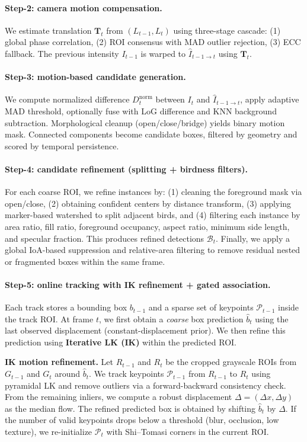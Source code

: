 \paragraph{Step-2: camera motion compensation.}
We estimate translation $\mathbf{T}_t$ from $(L_{t-1}, L_t)$ using three-stage cascade: (1) global phase correlation, (2) ROI consensus with MAD outlier rejection, (3) ECC fallback. The previous intensity $I_{t-1}$ is warped to $\hat{I}_{t-1\rightarrow t}$ using $\mathbf{T}_t$.

\paragraph{Step-3: motion-based candidate generation.}
We compute normalized difference $D^{\text{norm}}_t$ between $I_t$ and $\hat{I}_{t-1\rightarrow t}$, apply adaptive MAD threshold, optionally fuse with LoG difference and KNN background subtraction. Morphological cleanup (open/close/bridge) yields binary motion mask. Connected components become candidate boxes, filtered by geometry and scored by temporal persistence.


\paragraph{Step-4: candidate refinement (splitting + birdness filters).}
For each coarse ROI, we refine instances by:
(1) cleaning the foreground mask via open/close,
(2) obtaining confident centers by distance transform,
(3) applying marker-based watershed to split adjacent birds,
and (4) filtering each instance by area ratio, fill ratio, foreground occupancy, aspect ratio, minimum side length, and specular fraction.
This produces refined detections $\mathcal{B}_t$. Finally, we apply a global IoA-based suppression and relative-area filtering to remove residual nested or fragmented boxes within the same frame.

\paragraph{Step-5: online tracking with IK refinement + gated association.}
Each track stores a bounding box $b_{t-1}$ and a sparse set of keypoints $\mathcal{P}_{t-1}$ inside the track ROI.
At frame $t$, we first obtain a \emph{coarse} box prediction $\hat{b}_t$ using the last observed displacement (constant-displacement prior).
We then refine this prediction using \textbf{Iterative LK (IK)} within the predicted ROI.

\textbf{IK motion refinement.}
Let $R_{t-1}$ and $R_t$ be the cropped grayscale ROIs from $G_{t-1}$ and $G_t$ around $\hat{b}_t$.
We track keypoints $\mathcal{P}_{t-1}$ from $R_{t-1}$ to $R_t$ using pyramidal LK and remove outliers via a forward-backward consistency check.
From the remaining inliers, we compute a robust displacement $\Delta=(\Delta x,\Delta y)$ as the median flow.
The refined predicted box is obtained by shifting $\hat{b}_t$ by $\Delta$.
If the number of valid keypoints drops below a threshold (blur, occlusion, low texture), we re-initialize $\mathcal{P}_{t}$ with Shi--Tomasi corners in the current ROI.

